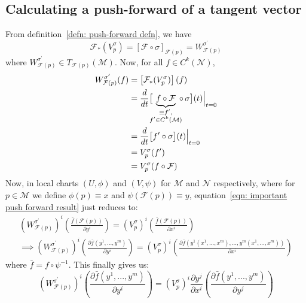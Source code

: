     \subsection{Calculating a push-forward of a tangent vector}
      \label{subsec: calculating a push-forward of a tangent vector}
      From definition~\ref{defn: push-forward defn}, we have
      \[\mathcal{F}_{*}(V_p^\sigma) = [\mathcal{F} \circ
      \sigma]_{\mathcal{F}(p)} = W^{\sigma^\prime}_{\mathcal{F}(p)}\]
      where $W^{\sigma^\prime}_{\mathcal{F}(p)} \in
      T_{\mathcal{F}(p)}(\mathcal{M})$. Now, for all $f \in
      C^k(\mathcal{N})$,
      \begin{align}
        W^{\sigma^\prime}_{\mathcal{F}(p)}(f) &=
        \left[\mathcal{F}_{*}(V_p^\sigma)\right](f) \nonumber \\
        &=\frac{d}{dt}\big[\mspace{-10mu}\underbrace{f \circ
        \mathcal{F}}_{\substack{\equiv f^\prime, \\
          f^\prime\in C^k(\mathcal{M})}} \mspace{-9mu} \circ\,
        \sigma\big](t)\Bigr|_{t = 0} \nonumber \\
        &= \frac{d}{dt}\big[f^\prime \circ \sigma \big](t)\Bigr|_{t = 0}\nonumber \\
        &= V^\sigma_p(f^\prime) \nonumber \\
        &= V^\sigma_p(f \circ \mathcal{F}) \label{eqn: important push forward result}
      \end{align}
    Now, in local charts $(U,\phi)$ and $(V,\psi)$ for $\mathcal{M}$ and
    $\mathcal{N}$ respectively, where for $p \in \mathcal{M}$ we define
    $\phi(p) \equiv x$ and $\psi(\mathcal{F}(p)) \equiv y$,
    equation~\ref{eqn: important push forward result} just reduces to:
    \begin{gather}
      \left( W^{\sigma^\prime}_{\mathcal{F}(p)} \right)^i
      \left(\frac{\bar{f}(\mathcal{F}(p))}{\partial y^i}\right) =
      \left(V_p^\sigma\right)^i\left(\frac{\bar{f}(\mathcal{F}(p))}{\partial
      x^i}\right) \label{eqn: push forward local chart part 1} \\
      \implies \left( W^{\sigma^\prime}_{\mathcal{F}(p)} \right)^i
      \left(\frac{\partial \bar{f}(y^1,...,y^m)}{\partial y^i}\right) =
      \left(V_p^\sigma\right)^i\left(\frac{\partial \bar{f}(y^1(x^1,...,x^m),...,y^m(x^1,...,x^m))}{\partial
      x^i}\right)
    \end{gather}
    where $\bar{f} = f \circ \psi^{-1}$. This finally gives us:
    \begin{equation}
      \label{eqn: push forward local chart part 3}
      \left( W^{\sigma^\prime}_{\mathcal{F}(p)} \right)^i
      \left(\frac{\partial \bar{f}(y^1,...,y^m)}{\partial y^i}\right) =
      \left(V_p^\sigma\right)^i \frac{\partial y^j}{\partial x^i}
      \left(\frac{\partial \bar{f}(y^1,...,y^m)}{\partial y^j}\right)
    \end{equation}

